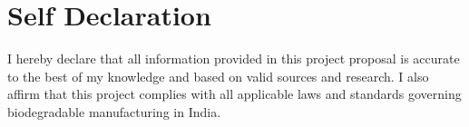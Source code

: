 \section*{Self Declaration}
I hereby declare that all information provided in this project proposal is accurate to the best of my knowledge and based on valid sources and research. I also affirm that this project complies with all applicable laws and standards governing biodegradable manufacturing in India.

\